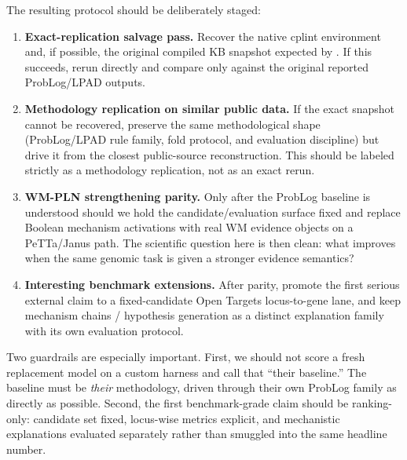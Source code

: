 \documentclass[11pt,openany]{report}
\begin{document}
The resulting protocol should be deliberately staged:
\begin{enumerate}
\item \textbf{Exact-replication salvage pass.}  Recover the native cplint
  environment and, if possible, the original compiled KB snapshot expected by
  .  If this succeeds, rerun
   directly and compare only against the original
  reported ProbLog/LPAD outputs.
\item \textbf{Methodology replication on similar public data.}  If the exact
  snapshot cannot be recovered, preserve the same methodological shape
  (ProbLog/LPAD rule family, fold protocol, and evaluation discipline) but
  drive it from the closest public-source reconstruction.  This should be
  labeled strictly as a methodology replication, not as an exact rerun.
\item \textbf{WM-PLN strengthening parity.}  Only after the ProbLog baseline is
  understood should we hold the candidate/evaluation surface fixed and replace
  Boolean mechanism activations with real WM evidence objects on a PeTTa/Janus
  path.  The scientific question here is then clean: what improves when the
  same genomic task is given a stronger evidence semantics?
\item \textbf{Interesting benchmark extensions.}  After parity, promote the
  first serious external claim to a fixed-candidate Open Targets locus-to-gene
  lane, and keep mechanism chains / hypothesis generation as a distinct
  explanation family with its own evaluation protocol.
\end{enumerate}

Two guardrails are especially important.  First, we should not score a fresh
replacement model on a custom harness and call that ``their baseline.''  The
baseline must be \emph{their} methodology, driven through their own ProbLog
family as directly as possible.  Second, the first benchmark-grade claim should
be ranking-only: candidate set fixed, locus-wise metrics explicit, and
mechanistic explanations evaluated separately rather than smuggled into the
same headline number.
\end{document}
